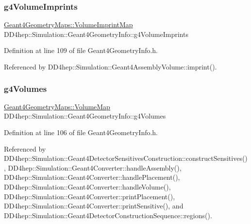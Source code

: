 \subsubsection{\texorpdfstring{g4\+Volume\+Imprints}{g4VolumeImprints}}
{\footnotesize\ttfamily \hyperlink{namespace_d_d4hep_1_1_simulation_1_1_geant4_geometry_maps_aade714d6f596f4d83009dcc2f3968d86}{Geant4\+Geometry\+Maps\+::\+Volume\+Imprint\+Map} D\+D4hep\+::\+Simulation\+::\+Geant4\+Geometry\+Info\+::g4\+Volume\+Imprints}



Definition at line 109 of file Geant4\+Geometry\+Info.\+h.



Referenced by D\+D4hep\+::\+Simulation\+::\+Geant4\+Assembly\+Volume\+::imprint().

\hypertarget{class_d_d4hep_1_1_simulation_1_1_geant4_geometry_info_a6699981243bf97abf6c16e51a72dcabb}{}\label{class_d_d4hep_1_1_simulation_1_1_geant4_geometry_info_a6699981243bf97abf6c16e51a72dcabb} 
\subsubsection{\texorpdfstring{g4\+Volumes}{g4Volumes}}
{\footnotesize\ttfamily \hyperlink{namespace_d_d4hep_1_1_simulation_1_1_geant4_geometry_maps_a85199a23e6a837678c8e5d5f902fb2e2}{Geant4\+Geometry\+Maps\+::\+Volume\+Map} D\+D4hep\+::\+Simulation\+::\+Geant4\+Geometry\+Info\+::g4\+Volumes}



Definition at line 106 of file Geant4\+Geometry\+Info.\+h.



Referenced by D\+D4hep\+::\+Simulation\+::\+Geant4\+Detector\+Sensitives\+Construction\+::construct\+Sensitives(), D\+D4hep\+::\+Simulation\+::\+Geant4\+Converter\+::handle\+Assembly(), D\+D4hep\+::\+Simulation\+::\+Geant4\+Converter\+::handle\+Placement(), D\+D4hep\+::\+Simulation\+::\+Geant4\+Converter\+::handle\+Volume(), D\+D4hep\+::\+Simulation\+::\+Geant4\+Converter\+::print\+Placement(), D\+D4hep\+::\+Simulation\+::\+Geant4\+Converter\+::print\+Sensitive(), and D\+D4hep\+::\+Simulation\+::\+Geant4\+Detector\+Construction\+Sequence\+::regions().

\hypertarget{class_d_d4hep_1_1_simulation_1_1_geant4_geometry_info_a913c884fc30046a6eb65702d11f4383f}{}\label{class_d_d4hep_1_1_simulation_1_1_geant4_geometry_info_a913c884fc30046a6eb65702d11f4383f} 
